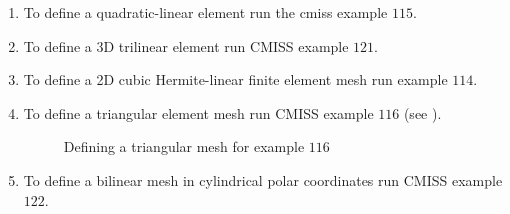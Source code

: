\begin{enumerate}
\item  To define a quadratic-linear element run the cmiss example $115$.
\item  To define a 3D trilinear element run CMISS example $121$.
\item  To define a 2D cubic Hermite-linear finite element mesh run 
    example $114$.

\item  To define a triangular element mesh run CMISS example $116$ (see ).
  \begin{figure}[htbp] \centering
    
    \label{fig:egdiag5}
    \caption{Defining a triangular mesh for example $116$}
    \label{fig:example116}
  \end{figure} 
  \label{sec:Deftem} 

\item  To define a bilinear mesh in cylindrical polar coordinates run CMISS
  example $122$.
  \label{sec:Defbm}
\end{enumerate}

